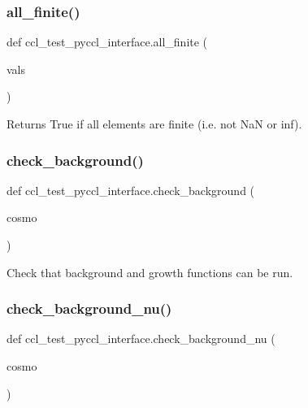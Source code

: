 \subsubsection{\texorpdfstring{all\+\_\+finite()}{all\_finite()}}
{\footnotesize\ttfamily def ccl\+\_\+test\+\_\+pyccl\+\_\+interface.\+all\+\_\+finite (\begin{DoxyParamCaption}\item[{}]{vals }\end{DoxyParamCaption})}

\begin{DoxyVerb}Returns True if all elements are finite (i.e. not NaN or inf).
\end{DoxyVerb}
 \mbox{\label{namespaceccl__test__pyccl__interface_abeb0e16edb05cf5ed17fd43254ea2d4b}} 
\subsubsection{\texorpdfstring{check\+\_\+background()}{check\_background()}}
{\footnotesize\ttfamily def ccl\+\_\+test\+\_\+pyccl\+\_\+interface.\+check\+\_\+background (\begin{DoxyParamCaption}\item[{}]{cosmo }\end{DoxyParamCaption})}

\begin{DoxyVerb}Check that background and growth functions can be run.
\end{DoxyVerb}
 \mbox{\label{namespaceccl__test__pyccl__interface_afd5e77929d503c6eaed00a8a0975c13a}} 
\subsubsection{\texorpdfstring{check\+\_\+background\+\_\+nu()}{check\_background\_nu()}}
{\footnotesize\ttfamily def ccl\+\_\+test\+\_\+pyccl\+\_\+interface.\+check\+\_\+background\+\_\+nu (\begin{DoxyParamCaption}\item[{}]{cosmo }\end{DoxyParamCaption})}

